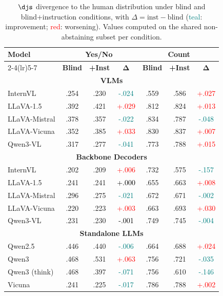\begin{table}[t]
\centering
\small
\setlength{\tabcolsep}{3pt}
\renewcommand{\arraystretch}{0.95}
\begin{tabular}{lcc@{\hspace{4pt}}cc@{\hspace{4pt}}cc}
\toprule
\multirow{2}{*}{\textbf{Model}} &
\multicolumn{3}{c}{\textbf{Yes/No}} &
\multicolumn{3}{c}{\textbf{Count}} \\
\cmidrule(lr){2-4}\cmidrule(lr){5-7}
& \textbf{Blind} & \textbf{+Inst} & $\mathbf{\Delta}$ & \textbf{Blind} & \textbf{+Inst} & $\mathbf{\Delta}$ \\
\midrule
\multicolumn{7}{c}{\textbf{VLMs}} \\
\midrule
InternVL & .254 & .230 & \textcolor{teal}{-.024} & .559 & .586 & \textcolor{red}{+.027} \\
LLaVA-1.5 & .392 & .421 & \textcolor{red}{+.029} & .812 & .824 & \textcolor{red}{+.013} \\
LLaVA-Mistral & .378 & .357 & \textcolor{teal}{-.022} & .834 & .787 & \textcolor{teal}{-.048} \\
LLaVA-Vicuna & .352 & .385 & \textcolor{red}{+.033} & .830 & .837 & \textcolor{red}{+.007} \\
Qwen3-VL & .317 & .277 & \textcolor{teal}{-.041} & .773 & .788 & \textcolor{red}{+.015} \\
\midrule
\multicolumn{7}{c}{\textbf{Backbone Decoders}} \\
\midrule
InternVL & .202 & .209 & \textcolor{red}{+.006} & .732 & .575 & \textcolor{teal}{-.157} \\
LLaVA-1.5 & .241 & .241 & \textcolor{black}{+.000} & .655 & .663 & \textcolor{red}{+.008} \\
LLaVA-Mistral & .296 & .275 & \textcolor{teal}{-.021} & .672 & .671 & \textcolor{teal}{-.002} \\
LLaVA-Vicuna & .220 & .223 & \textcolor{red}{+.003} & .663 & .693 & \textcolor{red}{+.030} \\
Qwen3-VL & .231 & .230 & \textcolor{black}{-.001} & .749 & .745 & \textcolor{teal}{-.004} \\
\midrule
\multicolumn{7}{c}{\textbf{Standalone LLMs}} \\
\midrule
Qwen2.5 & .446 & .440 & \textcolor{teal}{-.006} & .664 & .688 & \textcolor{red}{+.024} \\
Qwen3 & .468 & .531 & \textcolor{red}{+.063} & .756 & .721 & \textcolor{teal}{-.035} \\
Qwen3 (think) & .468 & .397 & \textcolor{teal}{-.071} & .756 & .610 & \textcolor{teal}{-.146} \\
Vicuna & .241 & .225 & \textcolor{teal}{-.017} & .786 & .788 & \textcolor{red}{+.002} \\
\bottomrule
\end{tabular}
\caption{$\djs$ divergence to the human distribution under blind and blind+instruction conditions, with $\Delta = \text{inst} - \text{blind}$ (\textcolor{teal}{teal}: improvement; \textcolor{red}{red}: worsening). Values computed on the shared non-abstaining subset per condition.}
\label{tab:hm_distribution_blind_vs_inst}
\end{table}
